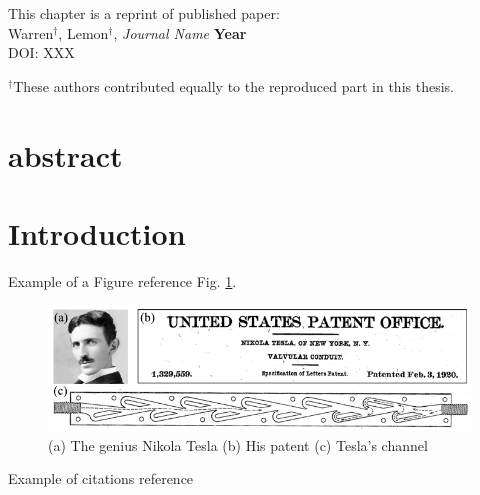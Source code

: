 
This chapter is a reprint of published paper: \\
Warren$^{\dagger}$, Lemon$^{\dagger}$, \textit{Journal Name} \textbf{Year} \\ %
DOI: XXX

$^{\dagger}$These authors contributed equally to the reproduced part in this thesis.


\section*{abstract}
\lipsum[1]



\section{Introduction}
\lipsum[2]

Example of a Figure reference Fig. \ref{fig:ch2-patent}. 

\begin{figure}
\centering
\includegraphics[width=16.5cm]{figures/ch_chapter2/fig1.pdf}\vspace{-0.2cm}
\caption{(a) The genius Nikola Tesla (b) His patent (c) Tesla's channel }
\label{fig:ch2-patent}
\end{figure}

Example of citations reference ~\cite{singer2013natural}
